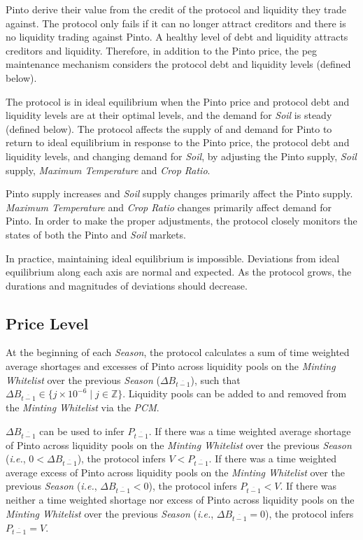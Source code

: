 \documentclass[tikz]{article}
\newcommand{\term}[1]{\textsl{#1}}
\begin{document}
Pinto derive their value from the credit of the protocol and liquidity they trade against. The protocol only fails if it can no longer attract creditors and there is no liquidity trading against Pinto. A healthy level of debt and liquidity attracts creditors and liquidity. Therefore, in addition to the Pinto price, the peg maintenance mechanism considers the protocol debt and liquidity levels (defined below). 

The protocol is in ideal equilibrium when the Pinto price and protocol debt and liquidity levels are at their optimal levels, and the demand for \term{Soil} is steady (defined below). The protocol affects the supply of and demand for Pinto to return to ideal equilibrium in response to the Pinto price, the protocol debt and liquidity levels, and changing demand for \term{Soil}, by adjusting the Pinto supply, \term{Soil} supply, \term{Maximum Temperature} and \term{Crop Ratio}. 

Pinto supply increases and \term{Soil} supply changes primarily affect the Pinto supply. \term{Maximum Temperature} and \term{Crop Ratio} changes primarily affect demand for Pinto. In order to make the proper adjustments, the protocol closely monitors the states of both the Pinto and \term{Soil} markets.

In practice, maintaining ideal equilibrium is impossible. Deviations from ideal equilibrium along each axis are normal and expected. As the protocol grows, the durations and magnitudes of deviations should decrease. 


\vspace*{2mm}
\subsection{Price Level}
\vspace*{2mm}

At the beginning of each \term{Season}, the protocol calculates a sum of time weighted average shortages and excesses of Pinto across liquidity pools on the \term{Minting Whitelist} over the previous \term{Season} ($\Delta B_{\overline{t-1}}$), such that $\Delta B_{\overline{t-1}} \in \{j \times 10^{-6} \mid j \in \mathbb{Z} \}$. Liquidity pools can be added to and removed from the \term{Minting Whitelist} via the \term{PCM}.

$\Delta B_{\overline{t-1}}$ can be used to infer $P_{\overline{t-1}}$. If there was a time weighted average shortage of Pinto across liquidity pools on the \term{Minting Whitelist} over the previous \term{Season} (\textit{i.e.}, $0 < \Delta B_{\overline{t-1}}$), the protocol infers $V < P_{\overline{t-1}}$. If there was a time weighted average excess of Pinto across liquidity pools on the \term{Minting Whitelist} over the previous \term{Season} (\textit{i.e.}, $\Delta B_{\overline{t-1}} < 0$), the protocol infers $P_{\overline{t-1}} < V$. If there was neither a time weighted shortage nor excess of Pinto across liquidity pools on the \term{Minting Whitelist} over the previous \term{Season} (\textit{i.e.}, $\Delta B_{\overline{t-1}} = 0$), the protocol infers $P_{\overline{t-1}} = V$. 
\end{document}
